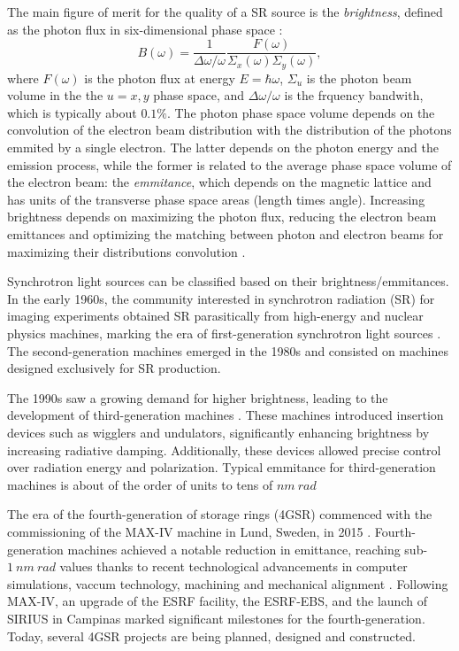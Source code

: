 The main figure of merit for the quality of a SR source is the \textit{brightness}\cite{huang_brightness_2013}, defined as the photon flux in six-dimensional phase space \cite{hettel_challenges_2014}:
\begin{equation}
    B(\omega) = \frac{1}{\Delta \omega/\omega}\frac{F(\omega)}{\Sigma_{x}(\omega)\Sigma_{y}(\omega)},
\end{equation}
where $F(\omega)$ is the photon flux at energy $E=\hbar\omega$, $\Sigma_{u}$ is the photon beam volume in the the $u=x,y$ phase space, and $\Delta\omega/\omega$ is the frquency bandwith, which is typically about $0.1\%$. The photon phase space volume depends on the convolution of the electron beam distribution with the distribution of the photons emmited by a single electron. The latter depends on the photon energy and the emission process, while the former is related to the average phase space volume of the electron beam: the \textit{emmitance}, which depends on the magnetic lattice and has units of the transverse phase space areas (length times angle). Increasing brightness depends on maximizing the photon flux, reducing the electron beam emittances and optimizing the matching between photon and electron beams for maximizing their distributions convolution \cite{wiedemann_particle_2015}.

Synchrotron light sources can be classified based on their brightness/emmitances. In the early 1960s, the community interested in synchrotron radiation (SR) for imaging experiments obtained SR parasitically from high-energy and nuclear physics machines, marking the era of first-generation synchrotron light sources \cite{liu_towards_2017}. The second-generation machines emerged in the 1980s and consisted on machines designed exclusively for SR production.

The 1990s saw a growing demand for higher brightness, leading to the development of third-generation machines \cite{liu_towards_2017}. These machines introduced insertion devices such as wigglers and undulators, significantly enhancing brightness by increasing radiative damping. Additionally, these devices allowed precise control over radiation energy and polarization. Typical emmitance for third-generation machines is about of the order of units to tens of $\unit{nm}~\unit{rad}$

The era of the fourth-generation of storage rings (4GSR) commenced with the commissioning of the MAX-IV machine in Lund, Sweden, in 2015 \cite{liu_towards_2017,hettel_challenges_2014}. Fourth-generation machines achieved a notable reduction in emittance, reaching sub-$1~\unit{nm}~\unit{rad}$ values thanks to recent technological advancements in computer simulations, vaccum technology, machining and mechanical alignment \cite{hettel_challenges_2014,liu_towards_2017}. Following MAX-IV, an upgrade of the ESRF facility, the ESRF-EBS, and the launch of SIRIUS in Campinas marked significant milestones for the fourth-generation. Today, several 4GSR projects are being planned, designed and constructed.

